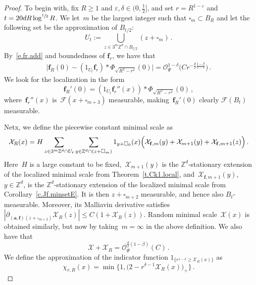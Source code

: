 \documentclass[11pt]{article} %
\let\oldsquare\square %
\renewcommand{\square}{\oldsquare}
\numberwithin{equation}{section}
\theoremstyle{definition}
\newcommand*{\Z}{\ensuremath{\mathbb{Z}}}
\newcommand{\eps}{\varepsilon}
\newcommand{\f}{\mathbf{f}}
\newcommand{\ep}{\eps}
\renewcommand{\a}{\mathbf{a}}
\newcommand{\cu}{\square}
\newcommand{\F}{\mathcal{F}}
\newcommand{\X}{\mathcal{X}}
\renewcommand{\O}{\mathcal{O}}
\newcommand{\indc}{1}
\newcommand{\minscale}{\chi}
\begin{document}
\begin{proof}
To begin with, fix $R \geq 1$ and $\ep,\delta \in (0,\frac12]$, and set $r = R^{1-\ep}$ and $t = 20 d R \log^{\sfrac 12} R$. We let~$m$ be the largest integer such that $\cu_m \subset B_R$ and let the following set be the approximation of $B_{t/2}$:
\begin{equation*}  
U_t := \bigcup_{z \in 3^m \Z^d \cap B_{t/2}} (z + \cu_m)\,.
\end{equation*}
By~\eqref{e.fr.add} and boundedness of $\f_r$, we have that
\begin{align*}  
\big| \f_R(0) - (\indc_{U_t} \f_r) \ast \Phi_{\sqrt{R^2-r^2}}(0) \big|   
= 
\O_\Psi^{1-\delta} \bigl( C r^{-\frac{d}{2}\frac{1-\beta}{1-\delta}} \bigr)\,.
\end{align*}
We look for the localization in the form
\begin{equation*}  
\f_R'(0) =  (\indc_{U_t} \f_r''(x)) \ast \Phi_{\sqrt{R^2-r^2}}(0)\,,
\end{equation*}
where~$\f_r''(x)$ is~$\F(x + \cu_{m+3})$ measurable, making~$\f_R'(0)$ clearly $\F(B_t)$ measurable. 


\smallskip

Netx, we define the piecewise constant minimal scale as
\begin{equation*}  
\X_R(x) = H \sum_{z \in 3^m \Z^d \cap U_t} \sum_{y \in \Z^d \cap (z + \cu_m)} 
\indc_{y + \cu_0}(x) \Bigl( \X_{\f,m}(y) + \X_{m+1}(y) + \X_{\f,m+1}(z) \Bigr)\,.
\end{equation*}
Here~$H$ is a large constant to be fixed,~$\X_{m+1}(y)$ is the $\Z^d$-stationary extension of the localized minimal scale from Theorem~\ref{t.Ck1.local}, and~$\X_{\f,m+1}(y)$, $y \in \Z^d$,  is the $\Z^d$-stationary extension of the localized minimal scale from Corollary~\ref{c.Jf.minsetE}. It is then $z + \cu_{m+2}$ measurable, and hence also $B_{t}$-measurable. Moreover, its Malliavin derivative satisfies~$|\partial_{(\a,\f)(z+\cu_{m+2})}\X_R(z)| \leq C(1 + \X_R(z))$. Random minimal scale~$\X(x)$ is obtained similarly, but now by taking~$m = \infty$ in the above definition. We also have that
\begin{equation*}  
\X + \X_R 
= 
\O_\Psi^{\frac d2(1-\beta)}(C)
\,.
\end{equation*}
We define the approximation of the indicator function $\indc_{\{ r^{1-\delta} \geq  \X_{R}(x)\}}$ as
\begin{equation}  \label{e.fr.localization.minscale}
\minscale_{r,R}(x) = \min\big\{1, \bigl(2 -    r^{\delta-1} \X_{R}(x) \bigr)_+ \big\} \,.
\end{equation}


\end{proof}
\end{document}
